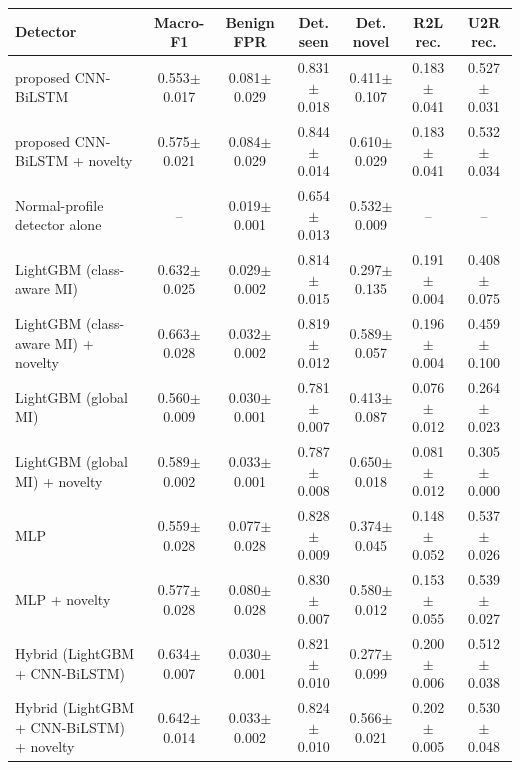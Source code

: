 \begin{tabular}{lcccccc}
\toprule
Detector & Macro-F1 & Benign FPR & Det. seen & Det. novel & R2L rec. & U2R rec. \\
\midrule
proposed CNN-BiLSTM & 0.553$\pm$0.017 & 0.081$\pm$0.029 & 0.831$\pm$0.018 & 0.411$\pm$0.107 & 0.183$\pm$0.041 & 0.527$\pm$0.031 \\
proposed CNN-BiLSTM + novelty & 0.575$\pm$0.021 & 0.084$\pm$0.029 & 0.844$\pm$0.014 & 0.610$\pm$0.029 & 0.183$\pm$0.041 & 0.532$\pm$0.034 \\
Normal-profile detector alone & -- & 0.019$\pm$0.001 & 0.654$\pm$0.013 & 0.532$\pm$0.009 & -- & -- \\
LightGBM (class-aware MI) & 0.632$\pm$0.025 & 0.029$\pm$0.002 & 0.814$\pm$0.015 & 0.297$\pm$0.135 & 0.191$\pm$0.004 & 0.408$\pm$0.075 \\
LightGBM (class-aware MI) + novelty & 0.663$\pm$0.028 & 0.032$\pm$0.002 & 0.819$\pm$0.012 & 0.589$\pm$0.057 & 0.196$\pm$0.004 & 0.459$\pm$0.100 \\
LightGBM (global MI) & 0.560$\pm$0.009 & 0.030$\pm$0.001 & 0.781$\pm$0.007 & 0.413$\pm$0.087 & 0.076$\pm$0.012 & 0.264$\pm$0.023 \\
LightGBM (global MI) + novelty & 0.589$\pm$0.002 & 0.033$\pm$0.001 & 0.787$\pm$0.008 & 0.650$\pm$0.018 & 0.081$\pm$0.012 & 0.305$\pm$0.000 \\
MLP & 0.559$\pm$0.028 & 0.077$\pm$0.028 & 0.828$\pm$0.009 & 0.374$\pm$0.045 & 0.148$\pm$0.052 & 0.537$\pm$0.026 \\
MLP + novelty & 0.577$\pm$0.028 & 0.080$\pm$0.028 & 0.830$\pm$0.007 & 0.580$\pm$0.012 & 0.153$\pm$0.055 & 0.539$\pm$0.027 \\
Hybrid (LightGBM + CNN-BiLSTM) & 0.634$\pm$0.007 & 0.030$\pm$0.001 & 0.821$\pm$0.010 & 0.277$\pm$0.099 & 0.200$\pm$0.006 & 0.512$\pm$0.038 \\
Hybrid (LightGBM + CNN-BiLSTM) + novelty & 0.642$\pm$0.014 & 0.033$\pm$0.002 & 0.824$\pm$0.010 & 0.566$\pm$0.021 & 0.202$\pm$0.005 & 0.530$\pm$0.048 \\
\bottomrule
\end{tabular}

